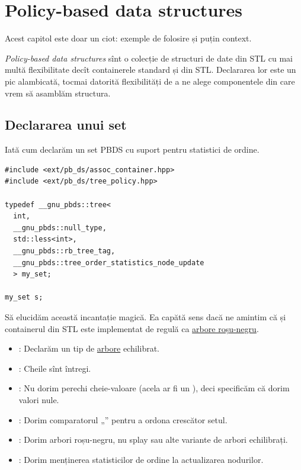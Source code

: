 \documentclass[../main.tex]{subfiles}
\begin{document}
\chapter{Policy-based data structures}

Acest capitol este doar un ciot: exemple de folosire și puțin context.

\textit{Policy-based data structures} sînt o colecție de structuri de date din STL cu mai multă flexibilitate decît containerele standard  și  din STL. Declararea lor este un pic alambicată, tocmai datorită flexibilități de a ne alege componentele din care vrem să asamblăm structura.


\section{Declararea unui set}

Iată cum declarăm un set PBDS cu suport pentru statistici de ordine.

\begin{verbatim}
#include <ext/pb_ds/assoc_container.hpp>
#include <ext/pb_ds/tree_policy.hpp>

typedef __gnu_pbds::tree<
  int,
  __gnu_pbds::null_type,
  std::less<int>,
  __gnu_pbds::rb_tree_tag,
  __gnu_pbds::tree_order_statistics_node_update
  > my_set;

my_set s;
\end{verbatim}

Să elucidăm această incantație magică. Ea capătă sens dacă ne amintim că și containerul  din STL este implementat de regulă ca \href{https://en.cppreference.com/w/cpp/container/set.html}{arbore roșu-negru}.

\begin{itemize}
  \item {}: Declarăm un tip de \href{https://gcc.gnu.org/onlinedocs/libstdc\%2B\%2B/manual/policy_data_structures_design.html#pbds.design.container.tree}{arbore} echilibrat.
  \item {}: Cheile sînt întregi.
  \item {}: Nu dorim perechi cheie-valoare (acela ar fi un ), deci specificăm că dorim valori nule.
  \item {}: Dorim comparatorul „\ccode{<}” pentru a ordona crescător setul.
  \item {}: Dorim arbori roșu-negru, nu splay sau alte variante de arbori echilibrați.
  \item {}: Dorim menținerea statisticilor de ordine la actualizarea nodurilor.
\end{itemize}
\end{document}
